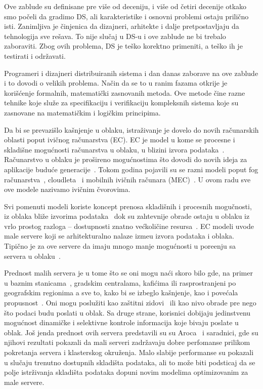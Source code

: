 Ove zablude su definisane pre vi\v se od deceniju, i više od \v cetiri decenije otkako smo po\v celi da gradimo DS, ali karakteristike i osnovni problemi ostaju prili\v cno isti. Zanimljiva je \v cinjenica da dizajneri, arhitekte i dalje pretpostavljaju da tehnologija sve re\v sava. To nije slu\v caj u DS-u i ove zablude ne bi trebalo zaboraviti. Zbog ovih problema, DS je te\v sko korektno primeniti, a te\v sko ih je testirati i odr\v zavati.

Programeri i dizajneri distribuiranih sistema i dan danas zaborave na ove zablude i to dovodi o velikih problema. Na\v cin da se to u ranim fazama otkrije je kori\v s\'cenje formalnih, matemati\v cki zasnovanih metoda. Ove metode \v cine razne tehnike koje slu\v ze za specifikaciju i verifikaciju kompleksnih sistema koje su zasnovane na matemati\v ckim i logi\v ckim principima.

Da bi se prevazi\v slo ka\v snjenje u oblaku, istra\v zivanje je dovelo do novih ra\v cunarskih oblasti poput ivi\v cnog ra\v cunarstva (EC). EC je model u kome se procesne i skladi\v sne mogu\'cnosti ra\v cunarstva u oblaku, u blizini izvora podataka~\cite{Satyanarayanan17}. Ra\v cunarstvo u oblaku je pro\v sireno mogu\'cnostima \v sto dovodi do novih ideja za aplikacije budu\'ce generacije~\cite{NingLSY20}. Tokom godina pojavili su se razni modeli poput fog ra\v cunarstva~\cite{BonomiMNZ14}, cloudleta~\cite {MonsalveCC18} i mobilnih ivi\v cnih ra\v cunara (MEC)~\cite{WangZZWYW17}. U ovom radu sve ove modele nazivamo ivi\v cnim \v cvorovima. 

Svi pomenuti modeli koriste koncept prenosa skladi\v snih i procesnih mogu\v cnosti, iz oblaka bli\v ze izvorima podataka~\cite{KhuneP19} dok su zahtevnije obrade ostaju u oblaku iz vrlo prostog razloga -- dostupnosti znatno ve\'ckoli\v cine resursa~\cite{NingLSY20}. EC modeli uvode male servere koji se arhitekturalno nalaze izme\dj u izvora podataka i oblaka. Tipi\v cno je za ove servere da imaju mnogo manje mogu\'cnosti u pore\dj enju sa servera u oblaku~\cite{ChenHLLW15}. 

Prednost malih servera je u tome \v sto se oni mogu na\'ci skoro bilo gde, na primer u baznim stanicama~\cite{WangZZWYW17}, gradskim centralama, kafi\'cima ili rasprostranjeni po geografskim regionima a sve to, kako bi se izbeglo kašnjenje, kao i pove\'cala propusnost~\cite{MonsalveCC18}. Oni mogu poslu\v ziti kao za\v stitni zidovi~\cite{SatyanarayananK19} ili kao nivo obrade pre nego \v sto podaci budu poslati u oblak. Sa druge strane, korisnici dobijaju jedinstvenu mogu\'cnost dinami\v cke i selektivne kontrole informacija koje bivaju poslate u oblak. Jo\v s jenda prednost ovih servera predstavili su su Aroca~\cite{ArocaG12} i saradnici, gde su njihovi rezultati pokazali da mali serveri zadr\v zavaju dobre perfomanse prilikom pokretanja servera i klasterskog okru\v zenja. Malo slabije performanse su pokazali u slu\v caju trenutno dostupnih skladi\v sta podataka, ali to mo\v ze biti podsticaj da se polje istr\v zivanja skladi\v sta podataka dopuni novim modelima optimizovanim za male servere.


